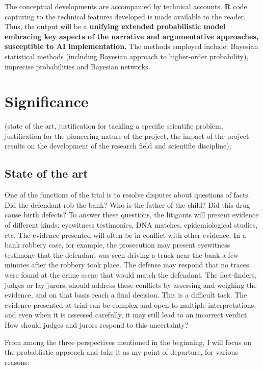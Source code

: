 \documentclass[11pt,dvipsnames,enabledeprecatedfontcommands]{scrartcl}
\begin{document}
The conceptual developments are accompanied by technical accounts.
\textbf{\textsf{R}} code capturing to the technical features developed
is made available to the reader. Thus, the output will be a
\textbf{unifying extended probabilistic model embracing key aspects of the narrative and argumentative approaches, susceptible to AI implementation.}
The methods employed include: Bayesian statistical methods (including
Bayesian approach to higher-order probability), imprecise probabilities
and Bayesian networks.

\section{Significance}\label{significance}

(state of the art, justification for tackling a specific scientific
problem, justification for the pioneering nature of the project, the
impact of the project results on the development of the research field
and scientific discipline);

\subsection{State of the art}\label{state-of-the-art}

One of the functions of the trial is to resolve disputes about questions
of facts. Did the defendant rob the bank? Who is the father of the
child? Did this drug cause birth defects? To answer these questions, the
litigants will present evidence of different kinds: eyewitness
testimonies, DNA matches, epidemiological studies, etc. The evidence
presented will often be in conflict with other evidence. In a bank
robbery case, for example, the prosecution may present eyewitness
testimony that the defendant was seen driving a truck near the bank a
few minutes after the robbery took place. The defense may respond that
no traces were found at the crime scene that would match the defendant.
The fact-finders, judges or lay jurors, should address these conflicts
by assessing and weighing the evidence, and on that basis reach a final
decision. This is a difficult task. The evidence presented at trial can
be complex and open to multiple interpretations, and even when it is
assessed carefully, it may still lead to an incorrect verdict. How
should judges and jurors respond to this uncertainty?

From among the three perspectives mentioned in the beginning, I will
focus on the probablistic approach and take it as my point of departure,
for various reasons:
\end{document}
